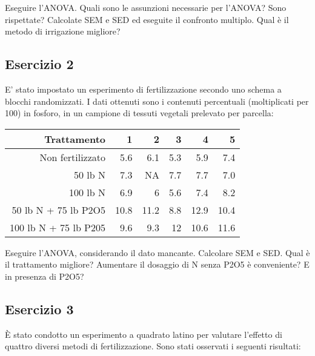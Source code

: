 \documentclass[a4paper,12pt,oneside]{book}
\begin{document}
Eseguire l'ANOVA. Quali sono le assunzioni necessarie per l'ANOVA? Sono rispettate? Calcolate SEM e SED ed eseguite il confronto multiplo. Qual è il metodo di irrigazione migliore?

\hypertarget{esercizio-2-5}{%
\subsection{Esercizio 2}\label{esercizio-2-5}}

E' stato impostato un esperimento di fertilizzazione secondo uno schema a blocchi randomizzati. I dati ottenuti sono i contenuti percentuali (moltiplicati per 100) in fosforo, in un campione di tessuti vegetali prelevato per parcella:

\begin{longtable}[]{@{}rrrrrr@{}}
\toprule
Trattamento & 1 & 2 & 3 & 4 & 5 \\
\midrule
\endhead
Non fertilizzato & 5.6 & 6.1 & 5.3 & 5.9 & 7.4 \\
50 lb N & 7.3 & NA & 7.7 & 7.7 & 7.0 \\
100 lb N & 6.9 & 6 & 5.6 & 7.4 & 8.2 \\
50 lb N + 75 lb P2O5 & 10.8 & 11.2 & 8.8 & 12.9 & 10.4 \\
100 lb N + 75 lb P205 & 9.6 & 9.3 & 12 & 10.6 & 11.6 \\
\bottomrule
\end{longtable}

Eseguire l'ANOVA, considerando il dato mancante. Calcolare SEM e SED. Qual è il trattamento migliore? Aumentare il dosaggio di N senza P2O5 è conveniente? E in presenza di P2O5?

\hypertarget{esercizio-3-5}{%
\subsection{Esercizio 3}\label{esercizio-3-5}}

È stato condotto un esperimento a quadrato latino per valutare l'effetto di quattro diversi metodi di fertilizzazione. Sono stati osservati i seguenti risultati:
\end{document}
